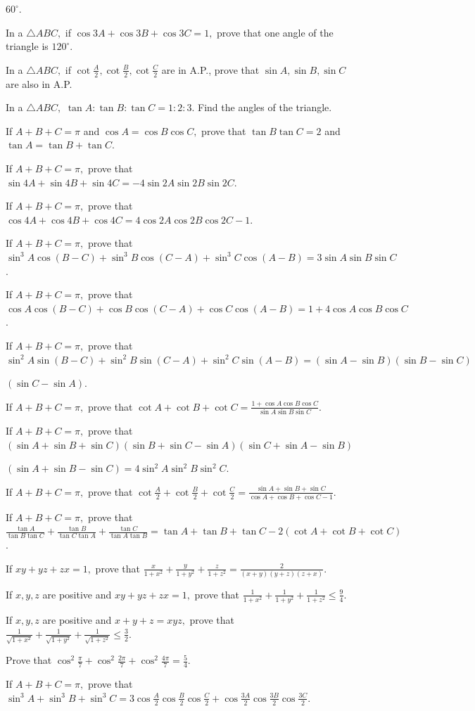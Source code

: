   $60^\circ$.
\item In a $\triangle ABC,$ if $\cos 3A + \cos 3B + \cos 3C = 1,$ prove that one angle of the triangle is $120^\circ$.
\item In a $\triangle ABC,$ if $\cot\frac{A}{2}, \cot\frac{B}{2}, \cot\frac{C}{2}$ are in A.P., prove that $\sin A, \sin
  B, \sin C$ are also in A.P.
\item In a $\triangle ABC,$ $\tan A : \tan B : \tan C = 1 : 2 : 3$. Find the angles of the triangle.
\item If $A + B + C = \pi$ and $\cos A = \cos B\cos C,$ prove that $\tan B\tan C = 2$ and $\tan A = \tan B + \tan C$.
\item If $A + B + C = \pi,$ prove that $\sin 4A + \sin 4B + \sin 4C = -4\sin 2A\sin 2B\sin 2C$.
\item If $A + B + C = \pi,$ prove that $\cos 4A + \cos 4B + \cos 4C = 4\cos 2A\cos 2B\cos 2C - 1$.
\item If $A + B + C = \pi,$ prove that $\sin^3A\cos(B - C) + \sin^3B\cos(C - A) + \sin^3C\cos(A - B) = 3\sin A\sin B\sin
  C$.
\item If $A + B + C = \pi,$ prove that $\cos A\cos(B - C) + \cos B\cos(C - A) + \cos C\cos(A - B) = 1 + 4\cos A\cos
  B\cos C$.
\item If $A + B + C = \pi,$ prove that $\sin^2A\sin(B - C) + \sin^2B\sin(C - A) + \sin^2C\sin(A - B) = (\sin A - \sin
  B)(\sin B - \sin C)$

  $(\sin C - \sin A)$.
\item If $A + B + C = \pi,$ prove that $\cot A + \cot B + \cot C = \frac{1 + \cos A\cos B\cos C}{\sin A\sin B\sin C}$.
\item If $A + B + C = \pi,$ prove that $(\sin A + \sin B + \sin C)(\sin B + \sin C - \sin A)(\sin C + \sin A - \sin B)$

  $(\sin A + \sin B - \sin C) = 4\sin^2A\sin^2B\sin^2C$.
\item If $A + B + C = \pi,$ prove that $\cot\frac{A}{2} + \cot\frac{B}{2} + \cot\frac{C}{2} = \frac{\sin A + \sin B +
  \sin C}{\cos A + \cos B + \cos C - 1}$.
\item If $A + B + C = \pi,$ prove that $\frac{\tan A}{\tan B\tan C} + \frac{\tan B}{\tan C\tan A} + \frac{\tan C}{\tan
  A\tan B} = \tan A + \tan B + \tan C - 2(\cot A + \cot B + \cot C)$.
\item If $xy + yz + zx = 1,$ prove that $\frac{x}{1 + x^2} + \frac{y}{1 + y^2} + \frac{z}{1 + z^2} = \frac{2}{(x + y)(y +
  z)(z + x)}$.
\item If $x, y, z$ are positive and $xy + yz + zx = 1,$ prove that $\frac{1}{1 + x^2} + \frac{1}{1 + y^2} + \frac{1}{1 +
  z^2} \leq \frac{9}{4}$.
\item If $x, y, z$ are positive and $x + y + z = xyz,$ prove that $\frac{1}{\sqrt{1 + x^2}} + \frac{1}{\sqrt{1 + y^2}} +
  \frac{1}{\sqrt{1 + z^2}} \leq \frac{3}{2}$.
\item Prove that $\cos^2\frac{\pi}{7} + \cos^2\frac{2\pi}{7} + \cos^2\frac{4\pi}{7} = \frac{5}{4}$.
\item If $A + B + C = \pi,$ prove that $\sin^3A + \sin^3B + \sin^3C = 3\cos\frac{A}{2}\cos\frac{B}{2}\cos\frac{C}{2} +
  \cos\frac{3A}{2}\cos\frac{3B}{2}\cos\frac{3C}{2}$.
\stopitemize
